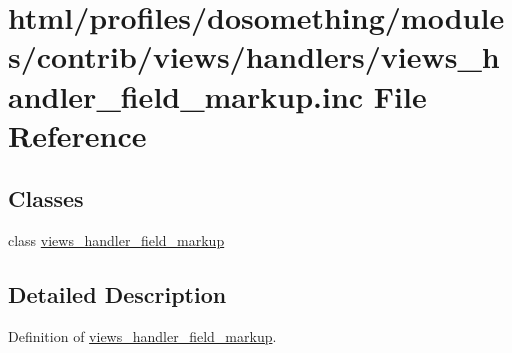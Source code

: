 \hypertarget{views__handler__field__markup_8inc}{
\section{html/profiles/dosomething/modules/contrib/views/handlers/views\_\-handler\_\-field\_\-markup.inc File Reference}
\label{views__handler__field__markup_8inc}
}
\subsection*{Classes}
\begin{DoxyCompactItemize}
\item 
class \hyperlink{classviews__handler__field__markup}{views\_\-handler\_\-field\_\-markup}
\end{DoxyCompactItemize}


\subsection{Detailed Description}
Definition of \hyperlink{classviews__handler__field__markup}{views\_\-handler\_\-field\_\-markup}. 